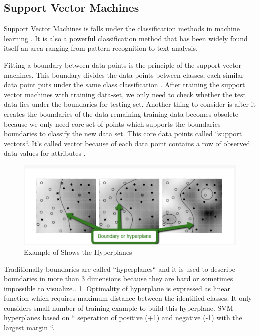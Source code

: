\documentclass[sigconf]{acmart}
\begin{document}
\subsection{Support Vector Machines}
Support Vector Machines is falls under the classification methods in machine learning \cite{www-simafore-svm}. It is also a powerful classification method that has been widely found itself an area ranging from pattern recognition to text analysis\cite{www-simafore-svm}. 
\par Fitting a boundary between data points is the principle of the support vector machines. This boundary divides the data points between classes, each similar data point puts under the same class classification \cite{www-simafore-svm}. After training the support vector machines with training data-set, we only need to check whether the test data lies under the boundaries for testing set. Another thing to consider is after it creates the boundaries of the data remaining training data becomes obsolete because we only need core set of points which supports the boundaries boundaries to classify the new data set. This core data points called ``support vectors``. It's called vector because of each data point contains a row of observed data values for attributes \cite{www-simafore-svm}. 

 \begin{figure}[!ht]
  \centering
      \includegraphics[width=\columnwidth]{project/images/hyperplane-boundary.png}
  \caption{Example of Shows the Hyperplanes \cite{www-simafore-svm}}\label{fig:Hyperplane}
\end{figure}

\par Traditionally boundaries are called ``hyperplanes`` and it is used to describe boundaries in more than 3 dimensions because they are hard or sometimes impossible to visualize.\cite{www-simafore}. \ref{fig:Hyperplane}. Optimality of hyperplane is expressed as linear function which requires maximum distance between the identified classes. It only considers small number of training example to build this hyperplane. SVM hyperplanes based on `` seperation of positive (+1) and negative (-1) with the largest margin \cite{verma-ssv}``.
\end{document}
